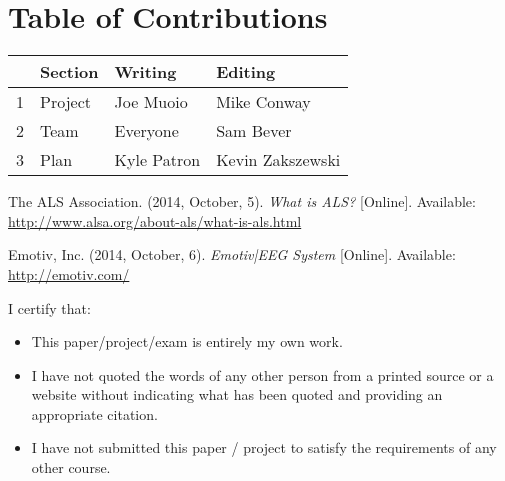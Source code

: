 \documentclass{report}
\begin{document}
\section*{\centering Table of Contributions}
\begin{tabular}{| l | l | l | l |}
    \hline
     & Section & Writing & Editing \\
    \hline \hline
    1 & Project & Joe Muoio  & Mike Conway \\ \hline
    2 & Team & Everyone & Sam Bever \\ \hline
    3 & Plan & Kyle Patron & Kevin Zakszewski \\ \hline
\end{tabular}
\begin{thebibliography}{1}

     The ALS Association. (2014, October, 5). \textit{What
        is ALS?} [Online]. Available:
        \url{http://www.alsa.org/about-als/what-is-als.html}
 
     Emotiv, Inc. (2014, October, 6). \textit{Emotiv|EEG
        System} [Online]. Available: \url{http://emotiv.com/}

\end{thebibliography}
\newpage
\noindent I certify that:
\begin{itemize}
\item This paper/project/exam is entirely my own work.
\item I have not quoted the words of any other person from a printed source or a website without indicating what has been quoted and providing an appropriate citation.
\item I have not submitted this paper / project to satisfy the requirements of any other course.
\end{itemize}

\vspace{1cm}
\noindent{}


\vspace{0.5cm}
\noindent{}

\vspace{0.5cm}
\noindent{}

\vspace{0.5cm}
\noindent{}
\end{document}
